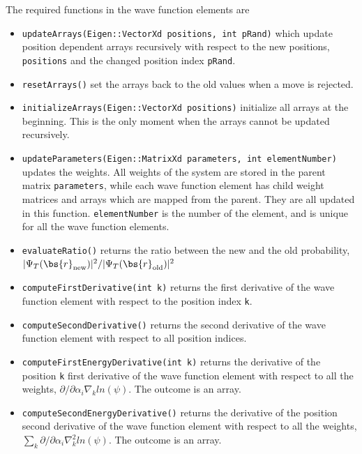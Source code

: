 The required functions in the wave function elements are
\begin{itemize}
	\item \texttt{updateArrays(Eigen::VectorXd positions, int pRand)} which update position dependent arrays recursively with respect to the new positions, \texttt{positions} and the changed position index \texttt{pRand}. 
	
	\item \texttt{resetArrays()} set the arrays back to the old values when a move is rejected.
	
	\item \texttt{initializeArrays(Eigen::VectorXd positions)} initialize all arrays at the beginning. This is the only moment when the arrays cannot be updated recursively. 
	
	\item \texttt{updateParameters(Eigen::MatrixXd parameters, int elementNumber)} updates the weights. All weights of the system are stored in the parent matrix \texttt{parameters}, while each wave function element has child weight matrices and arrays which are mapped from the parent. They are all updated in this function. \texttt{elementNumber} is the number of the element, and is unique for all the wave function elements.
	
	\item \texttt{evaluateRatio()} returns the ratio between the new and the old probability, \\ $|\Psi_T(\bs{r}_{\text{new}})|^2/|\Psi_T(\bs{r}_{\text{old}})|^2$
	
	\item \texttt{computeFirstDerivative(int k)} returns the first derivative of the wave function element with respect to the position index \texttt{k}.
	
	\item \texttt{computeSecondDerivative()} returns the second derivative of the wave function element with respect to all position indices. 
	
	\item \texttt{computeFirstEnergyDerivative(int k)} returns the derivative of the position \texttt{k} first derivative of the wave function element with respect to all the weights, $\partial/\partial \alpha_i \nabla_k ln(\psi)$. The outcome is an array.
	
	\item \texttt{computeSecondEnergyDerivative()} returns the derivative of the position second derivative of the wave function element with respect to all the weights, $\sum_k\partial/\partial \alpha_i \nabla_k^2 ln(\psi)$. The outcome is an array.
\end{itemize}
